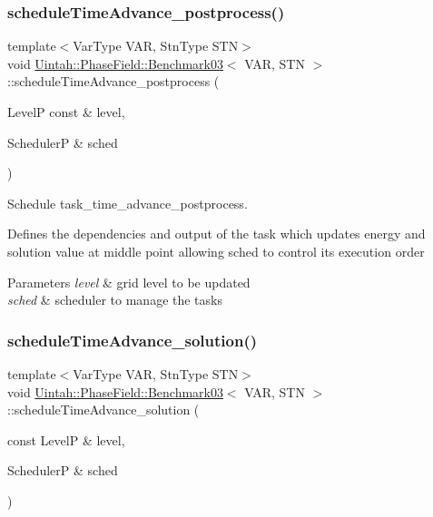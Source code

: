 \subsubsection{\texorpdfstring{schedule\+Time\+Advance\+\_\+postprocess()}{scheduleTimeAdvance\_postprocess()}}
{\footnotesize\ttfamily template$<$Var\+Type V\+AR, Stn\+Type S\+TN$>$ \\
void \hyperlink{classUintah_1_1PhaseField_1_1Benchmark03}{Uintah\+::\+Phase\+Field\+::\+Benchmark03}$<$ V\+AR, S\+TN $>$\+::schedule\+Time\+Advance\+\_\+postprocess (\begin{DoxyParamCaption}\item[{LevelP const \&}]{level,  }\item[{SchedulerP \&}]{sched }\end{DoxyParamCaption})\hspace{0.3cm}{\ttfamily [protected]}}



Schedule task\+\_\+time\+\_\+advance\+\_\+postprocess. 

Defines the dependencies and output of the task which updates energy and solution value at middle point allowing sched to control its execution order


\begin{DoxyParams}{Parameters}
{\em level} & grid level to be updated \\
\hline
{\em sched} & scheduler to manage the tasks \\
\hline
\end{DoxyParams}
\mbox{\label{classUintah_1_1PhaseField_1_1Benchmark03_a7c0d12cc78ef53dfd16049b452a41b64}} 
\subsubsection{\texorpdfstring{schedule\+Time\+Advance\+\_\+solution()}{scheduleTimeAdvance\_solution()}}
{\footnotesize\ttfamily template$<$Var\+Type V\+AR, Stn\+Type S\+TN$>$ \\
void \hyperlink{classUintah_1_1PhaseField_1_1Benchmark03}{Uintah\+::\+Phase\+Field\+::\+Benchmark03}$<$ V\+AR, S\+TN $>$\+::schedule\+Time\+Advance\+\_\+solution (\begin{DoxyParamCaption}\item[{const LevelP \&}]{level,  }\item[{SchedulerP \&}]{sched }\end{DoxyParamCaption})\hspace{0.3cm}{\ttfamily [protected]}}



